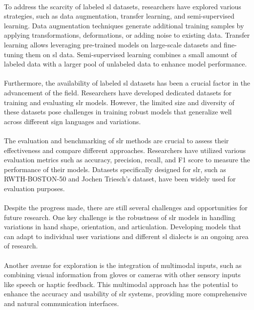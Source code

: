 \paragraph{}
To address the scarcity of labeled \ac{sl} datasets, researchers have explored various strategies, such as data augmentation, transfer learning, and semi-supervised learning. Data augmentation techniques generate additional training samples by applying transformations, deformations, or adding noise to existing data. Transfer learning allows leveraging pre-trained models on large-scale datasets and fine-tuning them on \ac{sl} data. Semi-supervised learning combines a small amount of labeled data with a larger pool of unlabeled data to enhance model performance.
\paragraph{}
Furthermore, the availability of labeled \ac{sl} datasets has been a crucial factor in the advancement of the field. Researchers have developed dedicated datasets for training and evaluating \ac{slr} models. However, the limited size and diversity of these datasets pose challenges in training robust models that generalize well across different sign languages and variations.
\paragraph{}
The evaluation and benchmarking of \ac{slr} methods are crucial to assess their effectiveness and compare different approaches. Researchers have utilized various evaluation metrics such as accuracy, precision, recall, and F1 score to measure the performance of their models. Datasets specifically designed for \ac{slr}, such as RWTH-BOSTON-50 and Jochen Triesch's dataset, have been widely used for evaluation purposes.
\paragraph{}
Despite the progress made, there are still several challenges and opportunities for future research. One key challenge is the robustness of \ac{slr} models in handling variations in hand shape, orientation, and articulation. Developing models that can adapt to individual user variations and different \ac{sl} dialects is an ongoing area of research.
\paragraph{}
Another avenue for exploration is the integration of multimodal inputs, such as combining visual information from gloves or cameras with other sensory inputs like speech or haptic feedback. This multimodal approach has the potential to enhance the accuracy and usability of \ac{slr} systems, providing more comprehensive and natural communication interfaces.